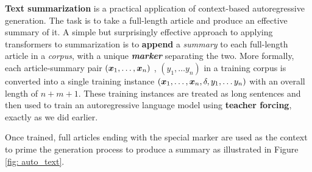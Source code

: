 \documentclass[11pt]{article}
\begin{document}
\textbf{Text summarization} is a practical application of context-based autoregressive generation. The task is to take a full-length article and produce an effective summary
of it. A simple but surprisingly effective approach to applying transformers to summarization is to \textbf{append} a \emph{summary} to each full-length article in a \emph{corpus}, with a unique \emph{\textbf{marker}} separating the two. More formally, each article-summary pair $(\boldsymbol{x}_1, \ldots, \boldsymbol{x}_n)$ , $(y_1, \ldots y_n)$ in a training corpus is converted into a single training instance $(\boldsymbol{x}_1, \ldots, \boldsymbol{x}_n, \delta, y_1, \ldots y_n)$ with an overall length of $n+ m+ 1$. These training instances
are treated as long sentences and then used to train an autoregressive language model using \textbf{teacher forcing}, exactly as we did earlier.

Once trained, full articles ending with the special marker are used as the context to prime the generation process to produce a summary as illustrated in Figure \ref{fig: auto_text}.




\newpage


\end{document}
